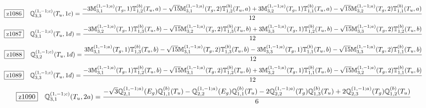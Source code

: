 \documentclass[fleqn,10pt,landscape]{jsarticle}
\begin{document}
\begin{dmath*}
\hspace*{3mm}\fbox{z1086}\quad \mathbb{Q}_{3,3}^{(1,-1;c)}(T_{u},1c)=\frac{- 3 \mathbb{M}_{3,1}^{(1,-1;a)}(T_{g},1) \mathbb{T}_{1,2}^{(b)}(T_{u},a) - \sqrt{15} \mathbb{M}_{3,1}^{(1,-1;a)}(T_{g},2) \mathbb{T}_{1,2}^{(b)}(T_{u},a) + 3 \mathbb{M}_{3,2}^{(1,-1;a)}(T_{g},1) \mathbb{T}_{1,1}^{(b)}(T_{u},a) - \sqrt{15} \mathbb{M}_{3,2}^{(1,-1;a)}(T_{g},2) \mathbb{T}_{1,1}^{(b)}(T_{u},a)}{12}
\end{dmath*}
\begin{dmath*}
\hspace*{3mm}\fbox{z1087}\quad \mathbb{Q}_{3,1}^{(1,-1;c)}(T_{u},1d)=\frac{- 3 \mathbb{M}_{3,2}^{(1,-1;a)}(T_{g},1) \mathbb{T}_{1,3}^{(b)}(T_{u},b) - \sqrt{15} \mathbb{M}_{3,2}^{(1,-1;a)}(T_{g},2) \mathbb{T}_{1,3}^{(b)}(T_{u},b) + 3 \mathbb{M}_{3,3}^{(1,-1;a)}(T_{g},1) \mathbb{T}_{1,2}^{(b)}(T_{u},b) - \sqrt{15} \mathbb{M}_{3,3}^{(1,-1;a)}(T_{g},2) \mathbb{T}_{1,2}^{(b)}(T_{u},b)}{12}
\end{dmath*}
\begin{dmath*}
\hspace*{3mm}\fbox{z1088}\quad \mathbb{Q}_{3,2}^{(1,-1;c)}(T_{u},1d)=\frac{3 \mathbb{M}_{3,1}^{(1,-1;a)}(T_{g},1) \mathbb{T}_{1,3}^{(b)}(T_{u},b) - \sqrt{15} \mathbb{M}_{3,1}^{(1,-1;a)}(T_{g},2) \mathbb{T}_{1,3}^{(b)}(T_{u},b) - 3 \mathbb{M}_{3,3}^{(1,-1;a)}(T_{g},1) \mathbb{T}_{1,1}^{(b)}(T_{u},b) - \sqrt{15} \mathbb{M}_{3,3}^{(1,-1;a)}(T_{g},2) \mathbb{T}_{1,1}^{(b)}(T_{u},b)}{12}
\end{dmath*}
\begin{dmath*}
\hspace*{3mm}\fbox{z1089}\quad \mathbb{Q}_{3,3}^{(1,-1;c)}(T_{u},1d)=\frac{- 3 \mathbb{M}_{3,1}^{(1,-1;a)}(T_{g},1) \mathbb{T}_{1,2}^{(b)}(T_{u},b) - \sqrt{15} \mathbb{M}_{3,1}^{(1,-1;a)}(T_{g},2) \mathbb{T}_{1,2}^{(b)}(T_{u},b) + 3 \mathbb{M}_{3,2}^{(1,-1;a)}(T_{g},1) \mathbb{T}_{1,1}^{(b)}(T_{u},b) - \sqrt{15} \mathbb{M}_{3,2}^{(1,-1;a)}(T_{g},2) \mathbb{T}_{1,1}^{(b)}(T_{u},b)}{12}
\end{dmath*}
\begin{dmath*}
\hspace*{3mm}\fbox{z1090}\quad \mathbb{Q}_{3,1}^{(1,-1;c)}(T_{u},2a)=\frac{- \sqrt{3} \mathbb{Q}_{2,1}^{(1,-1;a)}(E_{g}) \mathbb{Q}_{1,1}^{(b)}(T_{u}) - \mathbb{Q}_{2,2}^{(1,-1;a)}(E_{g}) \mathbb{Q}_{1,1}^{(b)}(T_{u}) - 2 \mathbb{Q}_{2,2}^{(1,-1;a)}(T_{g}) \mathbb{Q}_{1,3}^{(b)}(T_{u}) + 2 \mathbb{Q}_{2,3}^{(1,-1;a)}(T_{g}) \mathbb{Q}_{1,2}^{(b)}(T_{u})}{6}
\end{dmath*}
\end{document}
